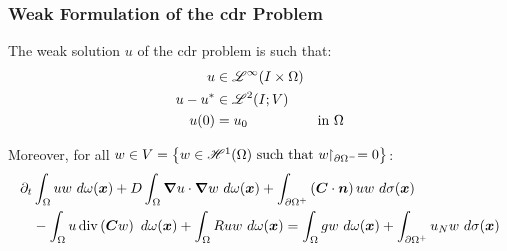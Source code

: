 \begin{frame}
    \frametitle{Weak Formulation of the \acrshort{cdr} Problem}

    \vspace*{\fill}
    \begin{center}
        \begin{minipage}{0.75\textwidth}
            \begin{definition}
                The weak solution $u$ of the \acrshort{cdr} problem is such that:
                \begin{align*}
                    u &\in \mathscr{L}^{\infty}(I \times \Omega) \\
                    u - u^* &\in \mathscr{L}^{2}(I; V) \\
                    u(0) &= u_0 &\text{in } \Omega
                \end{align*}

                Moreover, for all $w \in V =  \left\{ w \in \mathscr{H}^{1}(\Omega) \text{ such that } w \!\!\restriction_{\partial \Omega^-} = 0 \right\}$:
                \begin{align*}
                    \partial_t & \int_{\Omega} u w ~ d \omega(\bm{x}) + D \int_{\Omega} \bm{\nabla} u \cdot \bm{\nabla} w ~ d \omega(\bm{x}) + \int_{\partial \Omega^+} \left( \bm{C} \cdot \bm{n} \right) u w ~ d \sigma(\bm{x}) \\ 
                    &- \int_{\Omega} u \operatorname*{div} \left( \bm{C} w \right) ~ d \omega(\bm{x}) + \int_{\Omega} R u w ~ d \omega(\bm{x}) = \int_{\Omega} g w ~ d \omega(\bm{x}) + \int_{\partial \Omega^+} u_N w ~ d \sigma(\bm{x})
                \end{align*}
            \end{definition}
        \end{minipage}
    \end{center}
    \vspace*{\fill}
    
\end{frame}

